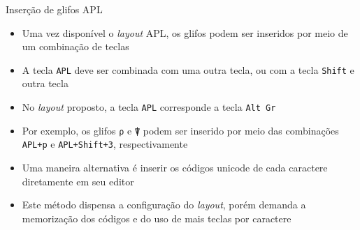 \begin{frame}[fragile]{Inserção de glifos APL}

    \begin{itemize}
        \item Uma vez disponível o \textit{layout} APL, os glifos podem ser inseridos por meio
            de um combinação de teclas
        \pause

        \item A tecla \texttt{APL} deve ser combinada com uma outra tecla, ou com a tecla
            \texttt{Shift} e outra tecla
        \pause

        \item No \textit{layout} proposto, a tecla \texttt{APL} corresponde a tecla
            \texttt{Alt Gr}
        \pause

        \item Por exemplo, os glifos \texttt{⍴} e \texttt{⍒} podem ser inserido por meio das combinações
            \texttt{APL+p} e \texttt{APL+Shift+3}, respectivamente

        \pause

        \item Uma maneira alternativa é inserir os códigos unicode de cada caractere diretamente
            em seu editor

        \pause

        \item Este método dispensa a configuração do \textit{layout}, porém demanda a memorização
            dos códigos e do uso de mais teclas por caractere
    \end{itemize}

\end{frame}
%



